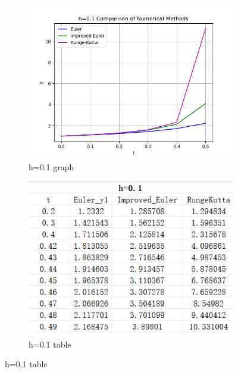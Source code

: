 \documentclass{article}
\begin{document}
\begin{figure}[htb] %
    \centering %

    \begin{subfigure}[b]{0.49\linewidth} %
        \centering
        \includegraphics[width=\linewidth]{pic/comp_0.1_fig.png} %
        \caption{h=0.1 graph} %
        \label{fig:kutta-1} %
    \end{subfigure}
    \hfill %
    \begin{subfigure}[b]{0.45\linewidth}
        \centering
        \includegraphics[width=\linewidth]{pic/comp0.1table.png}
        \caption{h=0.1 table} %
        \label{fig:kutta0} %
    \end{subfigure}
    \hfill %
\end{figure}
\end{document}
